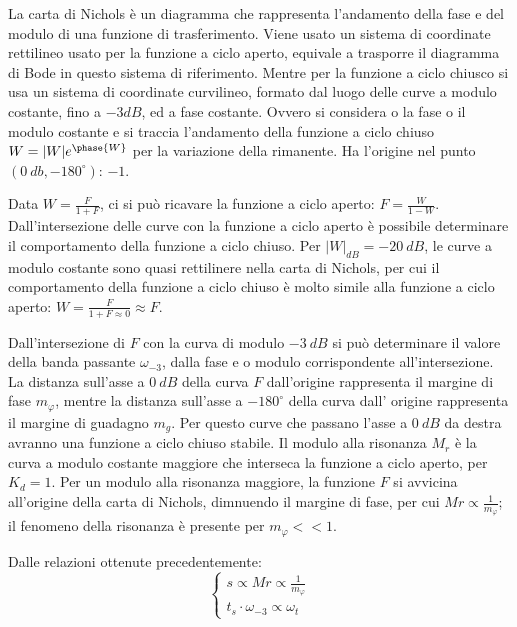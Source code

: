 \documentclass{article}
\numberwithin{equation}{subsection}
\begin{document}
La carta di Nichols è un diagramma che rappresenta l'andamento della fase e del modulo di una funzione di trasferimento. Viene usato un sistema di coordinate rettilineo 
usato per la funzione a ciclo aperto, equivale a trasporre il diagramma di Bode in questo sistema di riferimento. Mentre per la funzione 
a ciclo chiusco si usa un sistema di coordinate curvilineo, formato dal luogo delle curve a modulo costante, fino a $-3dB$, ed a fase costante. Ovvero si considera o la fase 
o il modulo costante e si traccia l'andamento della funzione a ciclo chiuso $W=|W|e^{\phase{W}}$ per la variazione della rimanente. Ha l'origine nel punto 
$(0\:db,-180^{\circ})$: $-1$. 



Data $W=\displaystyle\frac{F}{1+F}$, ci si può ricavare la funzione a ciclo aperto: $F=\displaystyle\frac{W}{1-W}$. Dall'intersezione delle curve con 
la funzione a ciclo aperto è possibile determinare il comportamento della funzione a ciclo chiuso. Per $|W|_{dB}=-20\:dB$, le curve a modulo costante sono quasi rettilinere nella 
carta di Nichols, per cui il comportamento della funzione a ciclo chiuso è molto simile alla funzione a ciclo aperto: 
$W=\displaystyle\frac{F}{1+F\approx0}\approx F$. 



Dall'intersezione di $F$ con la curva di modulo $-3\:dB$ si può determinare il valore della banda passante $\omega_{-3}$, dalla fase e o modulo corrispondente all'intersezione. 
La distanza sull'asse a $0\:dB$ della curva $F$ dall'origine rappresenta il margine di fase $m_{\varphi}$, mentre la distanza sull'asse a $-180^{\circ}$ della curva dall'
origine rappresenta il margine di guadagno $m_g$. 
Per questo curve che passano l'asse a $0\:dB$ da destra avranno una funzione a ciclo chiuso stabile. Il modulo alla 
risonanza $M_r$ è la curva a modulo costante maggiore che interseca la funzione a ciclo aperto, per $K_d=1$. Per un modulo alla risonanza maggiore, la funzione $F$ si avvicina 
all'origine della carta di Nichols, dimnuendo il margine di fase, per cui $Mr\propto\displaystyle\frac{1}{m_{\varphi}}$; il fenomeno della risonanza è presente per 
$m_{\varphi}<<1$. 

Dalle relazioni ottenute precedentemente: 
\begin{equation}
    \begin{cases}
        s\propto Mr\propto\displaystyle\frac{1}{m_{\varphi}}\\
        t_s\cdot\omega_{-3}\propto\omega_t
    \end{cases}
\end{equation}
\end{document}
